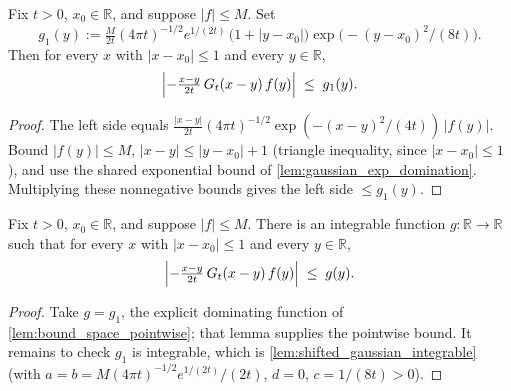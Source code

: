 \begin{lemma}
    \label{lem:bound_space_pointwise}
    Fix $t > 0$, $x_0 \in \mathbb{R}$, and suppose $\lvert f\rvert \le M$. Set
    \[ g_1(y) := \tfrac{M}{2t}(4\pi t)^{-1/2} e^{1/(2t)}\,\bigl(1 + \lvert y - x_0\rvert\bigr)
       \exp\!\bigl(-(y-x_0)^2/(8t)\bigr). \]
    Then for every $x$ with $\lvert x - x_0\rvert \le 1$ and every $y \in \mathbb{R}$,
    \[ \Bigl\lvert -\tfrac{x-y}{2t}\,G_t(x-y)\, f(y)\Bigr\rvert \;\le\; g_1(y). \]
\end{lemma}
\begin{proof}
    The left side equals
    $\tfrac{\lvert x-y\rvert}{2t}(4\pi t)^{-1/2}\exp(-(x-y)^2/(4t))\,\lvert f(y)\rvert$.
    Bound $\lvert f(y)\rvert \le M$, $\lvert x-y\rvert \le \lvert y - x_0\rvert + 1$
    (triangle inequality, since $\lvert x - x_0\rvert \le 1$), and use the shared
    exponential bound of \cref{lem:gaussian_exp_domination}. Multiplying these
    nonnegative bounds gives the left side $\le g_1(y)$.
\end{proof}

\begin{lemma}
    \label{lem:bound_space}
    \leanok
    Fix $t > 0$, $x_0 \in \mathbb{R}$, and suppose $\lvert f\rvert \le M$. There is an
    integrable function $g : \mathbb{R} \to \mathbb{R}$ such that for every $x$ with
    $\lvert x - x_0\rvert \le 1$ and every $y \in \mathbb{R}$,
    \[ \Bigl\lvert -\tfrac{x-y}{2t}\,G_t(x-y)\, f(y)\Bigr\rvert \;\le\; g(y). \]
\end{lemma}
\begin{proof}
    Take $g = g_1$, the explicit dominating function of
    \cref{lem:bound_space_pointwise}; that lemma supplies the pointwise bound. It
    remains to check $g_1$ is integrable, which is \cref{lem:shifted_gaussian_integrable}
    (with $a = b = M(4\pi t)^{-1/2} e^{1/(2t)}/(2t)$, $d = 0$, $c = 1/(8t) > 0$).
\end{proof}

